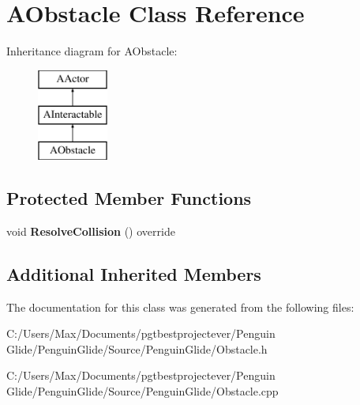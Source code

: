 \hypertarget{class_a_obstacle}{}\section{A\+Obstacle Class Reference}
\label{class_a_obstacle}
Inheritance diagram for A\+Obstacle\+:\begin{figure}[H]
\begin{center}
\leavevmode
\includegraphics[height=3.000000cm]{class_a_obstacle}
\end{center}
\end{figure}
\subsection*{Protected Member Functions}
\begin{DoxyCompactItemize}
\item 
\mbox{\label{class_a_obstacle_a71168a7223a250d37c95aef7325d3387}} 
void {\bfseries Resolve\+Collision} () override
\end{DoxyCompactItemize}
\subsection*{Additional Inherited Members}


The documentation for this class was generated from the following files\+:\begin{DoxyCompactItemize}
\item 
C\+:/\+Users/\+Max/\+Documents/pgtbestprojectever/\+Penguin Glide/\+Penguin\+Glide/\+Source/\+Penguin\+Glide/Obstacle.\+h\item 
C\+:/\+Users/\+Max/\+Documents/pgtbestprojectever/\+Penguin Glide/\+Penguin\+Glide/\+Source/\+Penguin\+Glide/Obstacle.\+cpp\end{DoxyCompactItemize}
